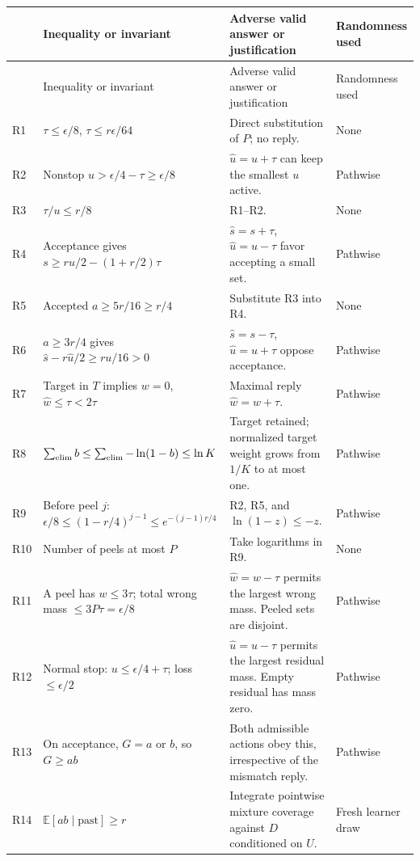 \documentclass[11pt]{article}
\newcommand{\E}{\mathbb E}
\newcommand{\1}{\mathbf 1}
\begin{document}
\small
\begin{longtable}{@{}p{.6cm}p{6.2cm}p{4.9cm}>{\raggedright\arraybackslash}p{2.4cm}@{}}
\toprule
& Inequality or invariant & Adverse valid answer or justification & Randomness used\\
\midrule\endfirsthead
\toprule & Inequality or invariant & Adverse valid answer or justification & Randomness used\\\midrule\endhead
R1 & $\tau\le\epsilon/8$, $\tau\le r\epsilon/64$ & Direct substitution of $P$; no reply. & None\\
R2 & Nonstop $u>\epsilon/4-\tau\ge\epsilon/8$ & $\widehat u=u+\tau$ can keep the smallest $u$ active. & Pathwise\\
R3 & $\tau/u\le r/8$ & R1--R2. & None\\
R4 & Acceptance gives $s\ge ru/2-(1+r/2)\tau$ & $\widehat s=s+\tau$, $\widehat u=u-\tau$ favor accepting a small set. & Pathwise\\
R5 & Accepted $a\ge5r/16\ge r/4$ & Substitute R3 into R4. & None\\
R6 & $a\ge3r/4$ gives $\widehat s-r\widehat u/2\ge ru/16>0$ & $\widehat s=s-\tau$, $\widehat u=u+\tau$ oppose acceptance. & Pathwise\\
R7 & Target in $T$ implies $w=0$, $\widehat w\le\tau<2\tau$ & Maximal reply $\widehat w=w+\tau$. & Pathwise\\
R8 & $\sum_{\rm elim}b\le\sum_{\rm elim}-\ln(1-b)\le\ln K$ & Target retained; normalized target weight grows from $1/K$ to at most one. & Pathwise\\
R9 & Before peel $j$: $\epsilon/8\le(1-r/4)^{j-1}\le e^{-(j-1)r/4}$ & R2, R5, and $\ln(1-z)\le-z$. & Pathwise\\
R10 & Number of peels at most $P$ & Take logarithms in R9. & None\\
R11 & A peel has $w\le3\tau$; total wrong mass $\le3P\tau=\epsilon/8$ & $\widehat w=w-\tau$ permits the largest wrong mass. Peeled sets are disjoint. & Pathwise\\
R12 & Normal stop: $u\le\epsilon/4+\tau$; loss $\le\epsilon/2$ & $\widehat u=u-\tau$ permits the largest residual mass. Empty residual has mass zero. & Pathwise\\
R13 & On acceptance, $G=a$ or $b$, so $G\ge ab$ & Both admissible actions obey this, irrespective of the mismatch reply. & Pathwise\\
R14 & $\E[ab\mid\text{past}]\ge r$ & Integrate pointwise mixture coverage against $D$ conditioned on $U$. & Fresh learner draw\\

\end{longtable}
\end{document}
